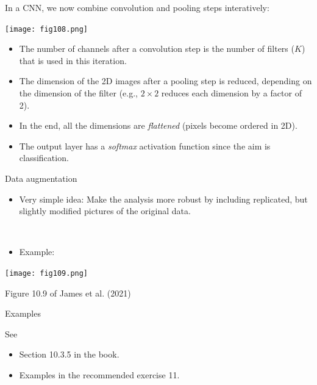 \documentclass[
  10pt,
  ignorenonframetext,
]{beamer}
\providecommand{\tightlist}{%
  \setlength{\itemsep}{0pt}\setlength{\parskip}{0pt}}
\begin{document}
\begin{frame}
In a CNN, we now combine convolution and pooling steps interatively:

\centering

\texttt{[image: fig108.png]}

\begin{itemize}
\item
  The number of channels after a convolution step is the number of
  filters (\(K\)) that is used in this iteration.
\item
  The dimension of the 2D images after a pooling step is reduced,
  depending on the dimension of the filter (e.g., \(2\times 2\) reduces
  each dimension by a factor of 2).
\item
  In the end, all the dimensions are \emph{flattened} (pixels become
  ordered in 2D).
\item
  The output layer has a \emph{softmax} activation function since the
  aim is classification.
\end{itemize}
\end{frame}

\begin{frame}
\begin{block}{Data augmentation}
\protect\hypertarget{data-augmentation}{}
\(~\)

\begin{itemize}
\tightlist
\item
  Very simple idea: Make the analysis more robust by including
  replicated, but slightly modified pictures of the original data.
\end{itemize}

\(~\)

\begin{itemize}
\tightlist
\item
  Example:
\end{itemize}

\texttt{[image: fig109.png]}

\scriptsize Figure 10.9 of James et al. (2021)
\end{block}
\end{frame}

\begin{frame}
\begin{block}{Examples}
\protect\hypertarget{examples}{}
\(~\)

See

\vspace{2mm}

\begin{itemize}
\tightlist
\item
  Section 10.3.5 in the book.
\end{itemize}

\vspace{2mm}

\begin{itemize}
\tightlist
\item
  Examples in the recommended exercise 11.
\end{itemize}
\end{block}
\end{frame}
\end{document}
